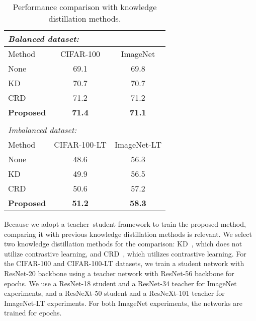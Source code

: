 \documentclass{article}
\theoremstyle{plain}
\theoremstyle{definition}
\theoremstyle{remark}
\begin{document}
\begin{table}[t]
\centering
\caption{Performance comparison with knowledge distillation methods.}
\begin{tabular}{lcc}
\multicolumn{3}{l}{\textit{Balanced dataset:}}                                                                  \\ \hline
\multicolumn{1}{l|}{Method}                         & \multicolumn{1}{c|}{CIFAR-100}     & ImageNet             \\ \hline
\multicolumn{1}{l|}{None}                           & \multicolumn{1}{c|}{69.1}          & 69.8                 \\
\multicolumn{1}{l|}{KD} & \multicolumn{1}{c|}{70.7}          & 70.7                 \\
\multicolumn{1}{l|}{CRD} & \multicolumn{1}{c|}{71.2}          & 71.2                 \\
\multicolumn{1}{l|}{\textbf{Proposed}}              & \multicolumn{1}{c|}{\textbf{71.4}} & \textbf{71.1}        \\ \hline
                                                    & \multicolumn{1}{l}{}               & \multicolumn{1}{l}{} \\
\multicolumn{3}{l}{\textit{Imbalanced dataset:}}                                                                \\ \hline
\multicolumn{1}{l|}{Method}                         & \multicolumn{1}{c|}{CIFAR-100-LT}  & ImageNet-LT          \\ \hline
\multicolumn{1}{l|}{None}                           & \multicolumn{1}{c|}{48.6}          & 56.3                 \\
\multicolumn{1}{l|}{KD} & \multicolumn{1}{c|}{49.9}          & 56.5                 \\
\multicolumn{1}{l|}{CRD} & \multicolumn{1}{c|}{50.6}          & 57.2                 \\
\multicolumn{1}{l|}{\textbf{Proposed}}              & \multicolumn{1}{c|}{\textbf{51.2}} & \textbf{58.3}        \\ \hline
\end{tabular}


%
 \label{tab:comp_kd}
\end{table}

Because we adopt a teacher--student framework to train the proposed method, comparing it with previous knowledge distillation methods is relevant. We select two knowledge distillation methods for the comparison: KD~\cite{hinton2015distilling}, which does not utilize contrastive learning, and CRD~\cite{tian2020contrastive}, which utilizes contrastive learning. For the CIFAR-100 and CIFAR-100-LT datasets, we train a student network with ResNet-20 backbone using a teacher network with ResNet-56 backbone for  epochs. We use a ResNet-18 student and a ResNet-34 teacher for ImageNet experiments, and a ResNeXt-50 student and a ResNeXt-101 teacher for ImageNet-LT experiments. For both ImageNet experiments, the networks are trained for  epochs.
\end{document}
